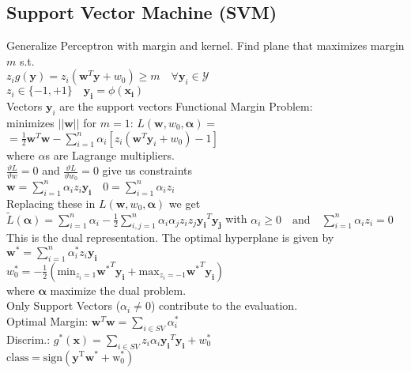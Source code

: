 \subsection*{Support Vector Machine (SVM)}
Generalize Perceptron with margin and kernel.
Find plane that maximizes margin $m$ s.t.\\
$z_ig(\mathbf{y})=z_i(\mathbf{w}^T\mathbf{y}+w_0)\geq m\quad\forall \mathbf{y}_i \in \mathcal{Y}$\\
$z_i \in \{-1,+1\}\quad \mathbf{y_i} = \phi(\mathbf{x_i})$\\
Vectors $\mathbf{y}_i$ are the support vectors
Functional Margin Problem:\\
minimizes $||\mathbf{w}||$ for $m{=}1$: 
$L(\mathbf{w}, w_0, \mathbf{\alpha}) {=}$\\
$=\frac{1}{2}\mathbf{w}^T\mathbf{w}{-}\sum_{i=1}^n\alpha_i[z_i(\mathbf{w}^T\mathbf{y}_i{}+w_0){-}1]$\\
where $\alpha$s are Lagrange multipliers.\\
$\frac{\vartheta L}{\vartheta w} {=} 0$ and $\frac{\vartheta L}{\vartheta w_0} {=} 0$ give us constraints\\
$\mathbf{w}=\sum_{i=1}^n\alpha_iz_i\mathbf{y_i} \quad 0=\sum_{i=1}^n\alpha_iz_i$\\
Replacing these in $L(\mathbf{w}, w_0, \mathbf{\alpha})$ we get\\
$\tilde{L}(\mathbf{\alpha}){=}\sum_{i=1}^n\alpha_i{-}\frac{1}{2}\sum_{i,j=1}^n\alpha_i\alpha_jz_iz_j\mathbf{y_i}^T\mathbf{y_j}$
with $\alpha_i\geq0\quad\mathrm{and}\quad\sum_{i=1}^n\alpha_iz_i=0$\\
This is the dual representation.
The optimal hyperplane is given by\\
$\mathbf{w^*}=\sum_{i=1}^n\alpha_i^*z_i\mathbf{y_i}$\\
$ w_0^*{=}{-}\frac{1}{2}(\mathrm{min}_{z_i=1}\mathbf{w^*}^T\mathbf{y_i}{+}\mathrm{max}_{z_i=-1}\mathbf{w^*}^T\mathbf{y_i})$\\
where $\mathbf{\alpha}$ maximize the dual problem.\\
Only Support Vectors ($\alpha_i\not=0$) contribute to the evaluation.\\
Optimal Margin: $\mathbf{w}^T\mathbf{w}=\sum_{i\in SV}\alpha_i^*$\\
Discrim.: $g^*(\mathbf{x}){=}\sum_{i\in SV}z_i\alpha_i\mathbf{y_i}^T\mathbf{y_i}{+}w^*_0$\\
$\mathrm{class} = \mathrm{sign(\mathbf{y}^T\mathbf{w}^*+w_0^*)}$

